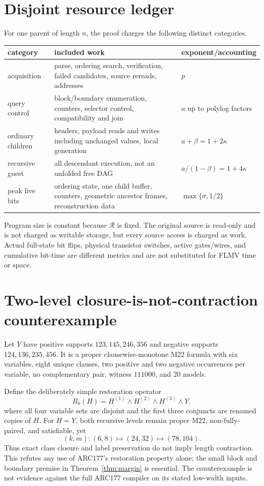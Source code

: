 \documentclass[11pt]{article}
\begin{document}
\section{Disjoint resource ledger}
For one parent of length $n$, the proof charges the following distinct
categories.
\begin{center}\small
\begin{tabularx}{\linewidth}{@{}lXl@{}}
\toprule
category & included work & exponent/accounting \\
\midrule
acquisition & parse, ordering search, verification, failed candidates,
source rereads, addresses & $p$ \\
query control & block/boundary enumeration, counters, selector control,
compatibility and join & $a$ up to polylog factors \\
ordinary children & headers, payload reads and writes including unchanged
values, local generation & $a+\beta=1+2\kappa$ \\
recursive guest & all descendant execution, not an unfolded free DAG &
$a/(1-\beta)=1+4\kappa$ \\
peak live bits & ordering state, one child buffer, counters, geometric
ancestor frames, reconstruction data & $\max\{\sigma,1/2\}$ \\
\bottomrule
\end{tabularx}
\end{center}
Program size is constant because $\mathcal R$ is fixed.  The original source
is read-only and is not charged as writable storage, but every source access
is charged as work.  Actual full-state bit flips, physical transistor
switches, active gates/wires, and cumulative bit-time are different metrics
and are not substituted for FLMV time or space.

\section{Two-level closure-is-not-contraction counterexample}
Let $Y$ have positive supports
$123,145,246,356$ and negative supports $124,136,235,456$.  It is a proper
clausewise-monotone M22 formula with six variables, eight unique clauses,
two positive and two negative occurrences per variable, no complementary
pair, witness $111000$, and 20 models.

Define the deliberately simple restoration operator
\[
 R_0(H)=H^{(1)}\wedge H^{(2)}\wedge H^{(3)}\wedge Y,
\]
where all four variable sets are disjoint and the first three conjuncts are
renamed copies of $H$.  For $H=Y$, both recursive levels remain proper M22,
non-fully-paired, and satisfiable, yet
\[
 (k,m): (6,8)\longmapsto(24,32)\longmapsto(78,104).
\]
Thus exact class closure and label preservation do not imply length
contraction.  This refutes any use of ARC177's restoration property alone;
the small block and boundary premise in Theorem~\ref{thm:margin} is essential.
The counterexample is not evidence against the full ARC177 compiler on its
stated low-width inputs.
\end{document}
